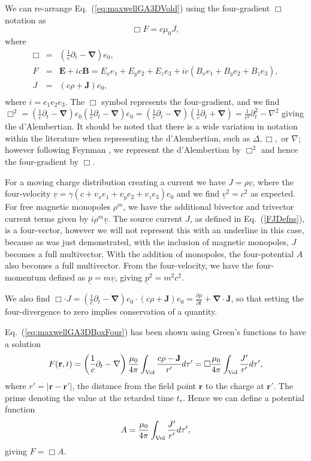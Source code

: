 \documentclass[12pt,aps,prb,preprint]{revtex4}   %
\newcommand{\be}{\begin{equation}}
\newcommand{\ee}{\end{equation}}
\newcommand{\bea}{\begin{eqnarray}}
\newcommand{\eea}{\end{eqnarray}}
\newcommand{\iGA}{{i}}
\begin{document}
We can re-arrange Eq.~(\ref{eq:maxwellGA3DVold}) using the four-gradient $ \Box $ notation as
\be \label{eq:maxwellGA3DBoxFour}
\Box  F = c \mu_0 J,
\ee
where 
\bea \label{FJDefns}
\Box & = &   (\frac{1}{c} \partial_t - \mathbf{\nabla}) e_0 , \\ \nonumber
F & = & \mathbf{E}+\iGA c \mathbf{B}   =  E_x e_1 + E_y e_2 + E_z e_3  + \iGA c ( B_x e_1+ B_y e_2 + B_z e_3 ) ,  \\ \nonumber
J & = & (c \rho + \mathbf{J} ) e_0 ,    \\ \nonumber
\eea
where $ \iGA = e_1 e_2 e_3 $.  The $ \Box $ symbol represents the four-gradient, and we find $ \Box^2 = (\frac{1}{c} \partial_t - \mathbf{\nabla}) e_0 (\frac{1}{c} \partial_t - \mathbf{\nabla}) e_0  = (\frac{1}{c} \partial_t - \mathbf{\nabla}) (\frac{1}{c} \partial_t + \mathbf{\nabla})  = \frac{1}{c^2} \partial_t^2 - \nabla^2 $ giving the d'Alembertian.  It should be noted that there is a wide variation in notation within the literature when representing the d'Alembertian, such as $ \Delta, \Box, $ or $ \nabla $; however following Feynman \cite{Feynman1964}, we represent the d'Alembertian by $ \Box^2 $ and hence the four-gradient by $ \Box $.  

For a moving charge distribution creating a current we have  $ J =  \rho \underline{v}  $, where the four-velocity $ \underline{v} = \gamma ( c + v_x e_1  + v_y e_2  + v_z e_3 ) e_0  $ and we find $ \underline{v}^2 = c^2 $ as expected. For free magnetic monopoles $ \rho^m $, we have the additional bivector and trivector current terms given by $ \iGA \rho^m \underline{v} $. The source current $ J $, as defined in Eq.~(\ref{FJDefns}), is a four-vector, however we will not represent this with an underline in this case,  because as was just demonstrated, with the inclusion of magnetic monopoles, $ J $ becomes a full multivector.  With the addition of monopoles, the four-potential $ A $ also becomes a full multivector. From the four-velocity, we have the four-momentum defined as $ \underline{p} = m \underline{v} $, giving $ \underline{p}^2 = m^2 c^2 $. 

We also find $ \Box \cdot J =  (\frac{1}{c} \partial_t - \mathbf{\nabla}) e_0 \cdot (c \rho + \mathbf{J} ) e_0 = \frac{ \partial \rho }{\partial t } + \mathbf{\nabla} \cdot \textbf{J} $, so that setting the four-divergence to zero implies conservation of a quantity.

Eq.~(\ref{eq:maxwellGA3DBoxFour}) has been shown \cite{Vold:1993} using Green's functions to have a solution
\be \label{eq:FieldSolutionIntegral}
F(\mathbf{r},t) = \left (\frac{1}{c} \partial_t - \mathbf{\nabla} \right ) \frac{\mu_0}{4 \pi}  \int_{\rm{Vol}} \frac{c  \rho -\mathbf{J}}{r'} d \tau' = \Box \frac{\mu_0}{4 \pi} \int_{\rm{Vol}} \frac{J'}{r'} d \tau' ,
\ee
where $ r' = | \mathbf{r} - \mathbf{r'} | $, the distance from the field point $ \mathbf{r} $ to the charge at $ \mathbf{r'} $. The prime denoting the value at the retarded time $ t_r $.  Hence we can define a potential function 
\be \label{eq:VectorPotentialIntegral}
A= \frac{\mu_0}{4 \pi} \int_{\rm{Vol}} \frac{J'}{r'} d \tau' ,
\ee
giving $ F = \Box A $.
\end{document}
